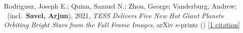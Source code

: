 \item[{\color{numcolor}\scriptsize1}] Rodriguez, Joseph E.; Quinn, Samuel N.; Zhou, George; Vanderburg, Andrew; \etal\ (incl.\ \textbf{Savel, Arjun}), 2021, \emph{TESS Delivers Five New Hot Giant Planets Orbiting Bright Stars from the Full Frame Images}, arXiv e-prints () [\href{https://ui.adsabs.harvard.edu/abs/2021arXiv210101726R}{1 citation}]